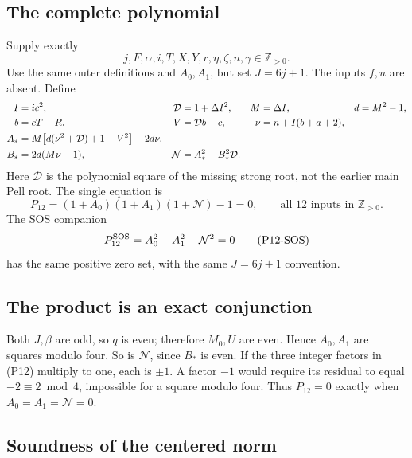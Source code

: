 \documentclass[11pt,a4paper]{article}
\theoremstyle{definition}
\newcommand{\Zp}{\mathbb Z_{>0}}
\begin{document}
\subsection{The complete polynomial}

Supply exactly
\[
 j,F,\alpha,i,T,X,Y,r,\eta,\zeta,n,\gamma\in\Zp.
\]
Use the same outer definitions and \(A_0,A_1\), but
set \(J=6j+1\). The inputs \(f,u\) are absent.
Define
\begin{align}
 I&=ic^2,&\mathcal D&=1+\Delta I^2,&
 M&=\Delta I,&d&=M^2-1, \notag\\
 b&=cT-R,&V&=\mathcal D b-c,&
 \nu&=n+I(b+a+2), \notag\\
 A_*&=M\bigl[d(\nu^2+\mathcal D)+1-V^2\bigr]-2d\nu,
 \notag\\
 B_*&=2d(M\nu-1),&
 \mathcal N&=A_*^2-B_*^2\mathcal D.              \label{eq:centered}
\end{align}
Here \(\mathcal D\) is the polynomial square of the missing
strong root, not the earlier main Pell root.
The single equation is
\[
 \boxed{P_{12}=(1+A_0)(1+A_1)(1+\mathcal N)-1=0,
           \qquad\text{all 12 inputs in }\Zp.}   \tag{P12}
\]
The SOS companion
\[
 P_{12}^{\rm SOS}=A_0^2+A_1^2+\mathcal N^2=0     \tag{P12-SOS}
\]
has the same positive zero set, with the same \(J=6j+1\)
convention.

\subsection{The product is an exact conjunction}

Both \(J,\beta\) are odd, so \(q\) is even; therefore
\(M_0,U\) are even. Hence \(A_0,A_1\) are squares modulo four.
So is \(\mathcal N\), since \(B_*\) is even.
If the three integer factors in (P12) multiply to one, each
is \(\pm1\). A factor \(-1\) would require its residual to
equal \(-2\equiv2\bmod4\), impossible for a square modulo four.
Thus \(P_{12}=0\) exactly when \(A_0=A_1=\mathcal N=0\).

\subsection{Soundness of the centered norm}
\end{document}
